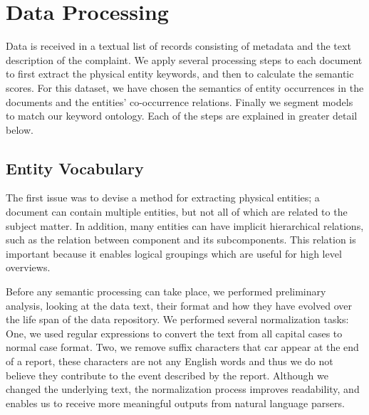 \chapter{Data Processing}
Data is received in a textual list of records consisting of metadata and the
text description of the complaint. We apply several processing steps to each
document to first extract the physical entity keywords, and then to calculate
the semantic scores. For this dataset, we have chosen the semantics of
entity occurrences in the documents and the entities' co-occurrence relations. 
Finally we segment \threed models to match our keyword ontology. Each of the steps 
are explained in greater detail below.


\section{Entity Vocabulary}
The first issue was to devise a method for extracting physical entities; a
document can contain multiple entities, but not all of which are related to the 
subject matter. In addition, many entities can have implicit hierarchical 
relations, such as the relation between component and its subcomponents. This 
relation is important because it enables logical groupings which are useful for
high level overviews.

Before any semantic processing can take place, we performed
preliminary analysis, looking at the data text, their format and how they have
evolved over the life span of the data repository. We performed several
normalization tasks: One, we used regular expressions to convert the text from
all capital cases to normal case format. Two, we remove suffix characters that
car appear at the end of a report, these characters are not any English words and thus
we do not believe they contribute to the event described by the report. Although we changed the underlying text, the
normalization process improves readability, and enables us to receive more
meaningful outputs from natural language parsers.

